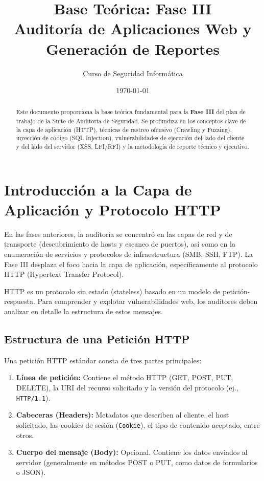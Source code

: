 \documentclass[12pt,letterpaper]{article}
\title{\textbf{Base Teórica: Fase III}\\ \Large Auditoría de Aplicaciones Web y Generación de Reportes}
\author{Curso de Seguridad Informática}
\date{\today}
\begin{document}
\maketitle

\begin{abstract}
Este documento proporciona la base teórica fundamental para la \textbf{Fase III} del plan de trabajo de la Suite de Auditoría de Seguridad. Se profundiza en los conceptos clave de la capa de aplicación (HTTP), técnicas de rastreo ofensivo (Crawling y Fuzzing), inyección de código (SQL Injection), vulnerabilidades de ejecución del lado del cliente y del lado del servidor (XSS, LFI/RFI) y la metodología de reporte técnico y ejecutivo.
\end{abstract}

\tableofcontents
\newpage

\section{Introducción a la Capa de Aplicación y Protocolo HTTP}
En las fases anteriores, la auditoría se concentró en las capas de red y de transporte (descubrimiento de hosts y escaneo de puertos), así como en la enumeración de servicios y protocolos de infraestructura (SMB, SSH, FTP). La Fase III desplaza el foco hacia la capa de aplicación, específicamente al protocolo HTTP (Hypertext Transfer Protocol).

HTTP es un protocolo sin estado (stateless) basado en un modelo de petición-respuesta. Para comprender y explotar vulnerabilidades web, los auditores deben analizar en detalle la estructura de estos mensajes.

\subsection{Estructura de una Petición HTTP}
Una petición HTTP estándar consta de tres partes principales:
\begin{enumerate}
    \item \textbf{Línea de petición:} Contiene el método HTTP (GET, POST, PUT, DELETE), la URI del recurso solicitado y la versión del protocolo (ej., \texttt{HTTP/1.1}).
    \item \textbf{Cabeceras (Headers):} Metadatos que describen al cliente, el host solicitado, las cookies de sesión (\texttt{Cookie}), el tipo de contenido aceptado, entre otros.
    \item \textbf{Cuerpo del mensaje (Body):} Opcional. Contiene los datos enviados al servidor (generalmente en métodos POST o PUT, como datos de formularios o JSON).
\end{enumerate}
\end{document}
